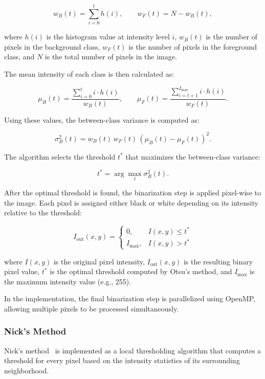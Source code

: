 \[
w_B(t) = \sum_{i=0}^{t} h(i), \qquad
w_F(t) = N - w_B(t),
\]

where $h(i)$ is the histogram value at intensity level $i$, $w_B(t)$ is the number of pixels in the background class, $w_F(t)$ is the number of pixels in the foreground class, and $N$ is the total number of pixels in the image.

The mean intensity of each class is then calculated as:

\[
\mu_B(t) = \frac{\sum_{i=0}^{t} i \cdot h(i)}{w_B(t)}, \qquad
\mu_F(t) = \frac{\sum_{i=t+1}^{I_{\text{max}}} i \cdot h(i)}{w_F(t)}.
\]

Using these values, the between-class variance is computed as:

\[
\sigma_B^2(t) = w_B(t)\,w_F(t)\,(\mu_B(t) - \mu_F(t))^2 .
\]

The algorithm selects the threshold $t^*$ that maximizes the
between-class variance:

\[
t^* = \arg\max_t \sigma_B^2(t).
\]

After the optimal threshold is found, the binarization step is applied
pixel-wise to the image. Each pixel is assigned either black or white
depending on its intensity relative to the threshold:

\[
I_{\text{out}}(x,y) =
\begin{cases}
0, & I(x,y) \le t^* \\
I_{\text{max}}, & I(x,y) > t^*
\end{cases}
\]

where $I(x,y)$ is the original pixel intensity, $I_{\text{out}}(x,y)$ is the resulting binary pixel value, $t^*$ is the optimal threshold computed by Otsu's method, and $I_{\text{max}}$ is the maximum intensity value (e.g., 255).

In the implementation, the final binarization step is parallelized
using OpenMP, allowing multiple pixels to be processed simultaneously.

\subsubsection{Nick's Method}

Nick's method~\cite{khurshid2009comparison} is implemented as a local thresholding algorithm that
computes a threshold for every pixel based on the intensity statistics
of its surrounding neighborhood.

